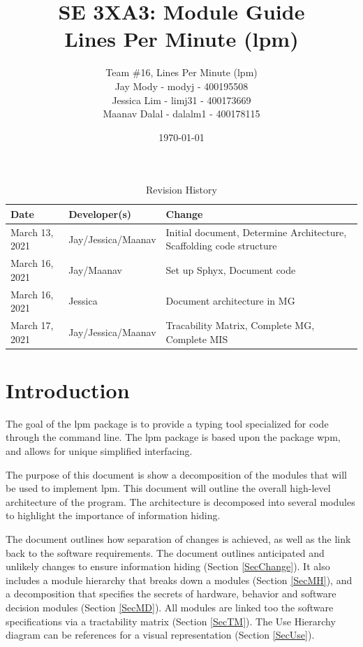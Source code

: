 \documentclass[12pt, titlepage]{article}
\title{\textbf{SE 3XA3: Module Guide}\\Lines Per Minute (lpm)}
\author{Team \#16, Lines Per Minute (lpm)\\
Jay Mody - modyj - 400195508\\
Jessica Lim - limj31 - 400173669\\
Maanav Dalal - dalalm1 - 400178115\\
}
\date{\today}
\begin{document}
\maketitle
\begin{table}[hp]
\caption{Revision History} \label{TblRevisionHistory}
\begin{tabularx}{\textwidth}{llX}
\toprule
\textbf{Date} & \textbf{Developer(s)} & \textbf{Change}\\
\midrule
March 13, 2021 & Jay/Jessica/Maanav & Initial document, Determine Architecture, Scaffolding code structure \\
\midrule
March 16, 2021 & Jay/Maanav & Set up Sphyx, Document code \\
\midrule
March 16, 2021 & Jessica & Document architecture in MG \\
\midrule
March 17, 2021 & Jay/Jessica/Maanav & Tracability Matrix, Complete MG, Complete MIS \\
\bottomrule
\end{tabularx}
\end{table}

\newpage 

\tableofcontents
\listoftables
\listoffigures

\newpage

\section{Introduction}

The goal of the lpm package is to provide a typing tool specialized for code through the command line. The lpm package is based upon the package wpm, and allows for unique simplified interfacing.

The purpose of this document is show a decomposition of the modules that will be used to implement lpm. This document will outline the overall high-level architecture of the program. The architecture is decomposed into several modules to highlight the importance of information hiding. 

The document outlines how separation of changes is achieved, as well as the link back to the software requirements. The document outlines anticipated and unlikely changes to ensure information hiding (Section \ref{SecChange}). It also includes a module hierarchy that breaks down a modules (Section \ref{SecMH}), and a decomposition that specifies the secrets of hardware, behavior and software decision modules (Section \ref{SecMD}). All modules are linked too the software specifications via a tractability matrix (Section \ref{SecTM}). The Use Hierarchy diagram can be references for a visual representation (Section \ref{SecUse}).
\end{document}
